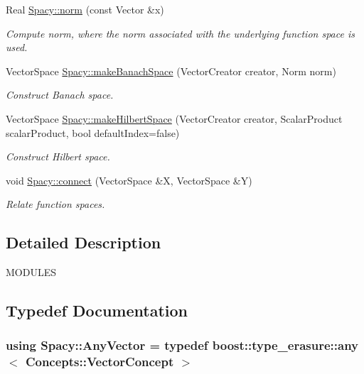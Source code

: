 \begin{DoxyCompactItemize}
Real \hyperlink{group__SpacyGroup_ga86a4fc266aa19a07b0af16388907354b_ga86a4fc266aa19a07b0af16388907354b}{Spacy\+::norm} (const Vector \&x)
\begin{DoxyCompactList}\small\item\em Compute norm, where the norm associated with the underlying function space is used. \end{DoxyCompactList}\item 
Vector\+Space \hyperlink{group__SpacyGroup_gabfc17f845736365ee79be8ce68d50b27_gabfc17f845736365ee79be8ce68d50b27}{Spacy\+::make\+Banach\+Space} (Vector\+Creator creator, Norm norm)
\begin{DoxyCompactList}\small\item\em Construct Banach space. \end{DoxyCompactList}\item 
Vector\+Space \hyperlink{group__SpacyGroup_ga63c49d211bf214be1fb321440ed03aad_ga63c49d211bf214be1fb321440ed03aad}{Spacy\+::make\+Hilbert\+Space} (Vector\+Creator creator, Scalar\+Product scalar\+Product, bool default\+Index=false)
\begin{DoxyCompactList}\small\item\em Construct Hilbert space. \end{DoxyCompactList}\item 
void \hyperlink{group__SpacyGroup_gad115dc8703f23d8070c7da07a59ca067_gad115dc8703f23d8070c7da07a59ca067}{Spacy\+::connect} (Vector\+Space \&X, Vector\+Space \&Y)
\begin{DoxyCompactList}\small\item\em Relate function spaces. \end{DoxyCompactList}\end{DoxyCompactItemize}


\subsection{Detailed Description}
M\+O\+D\+U\+L\+E\+S 

\subsection{Typedef Documentation}
\hypertarget{group__SpacyGroup_gafc144d2730ef87a67e54f8cd750b1f54_gafc144d2730ef87a67e54f8cd750b1f54}{}
\subsubsection[{Any\+Vector}]{\setlength{\rightskip}{0pt plus 5cm}using {\bf Spacy\+::\+Any\+Vector} = typedef boost\+::type\+\_\+erasure\+::any$<$ Concepts\+::\+Vector\+Concept $>$}\label{group__SpacyGroup_gafc144d2730ef87a67e54f8cd750b1f54_gafc144d2730ef87a67e54f8cd750b1f54}


